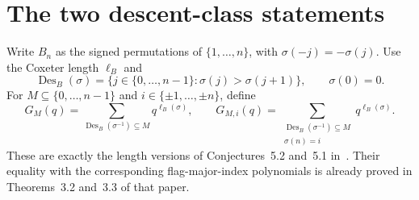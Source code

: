 \documentclass[11pt]{article}
\newcommand{\Des}{\operatorname{Des}}
\begin{document}
\section{The two descent-class statements}
Write $B_n$ as the signed permutations of $\{1,\ldots,n\}$, with
$\sigma(-j)=-\sigma(j)$. Use the Coxeter length $\ell_B$ and
\[
\Des_B(\sigma)=\{j\in\{0,\ldots,n-1\}:\sigma(j)>\sigma(j+1)\},
\qquad\sigma(0)=0.
\]
For $M\subseteq\{0,\ldots,n-1\}$ and $i\in\{\pm1,\ldots,\pm n\}$,
define
\[
G_M(q)=\sum_{\Des_B(\sigma^{-1})\subseteq M}q^{\ell_B(\sigma)},
\qquad
G_{M,i}(q)=\sum_{\substack{\Des_B(\sigma^{-1})\subseteq M\\\sigma(n)=i}}
q^{\ell_B(\sigma)}.
\]
These are exactly the length versions of Conjectures~5.2 and~5.1
in~\cite{ABR}. Their equality with the corresponding flag-major-index
polynomials is already proved in Theorems~3.2 and~3.3 of that paper.
\end{document}
